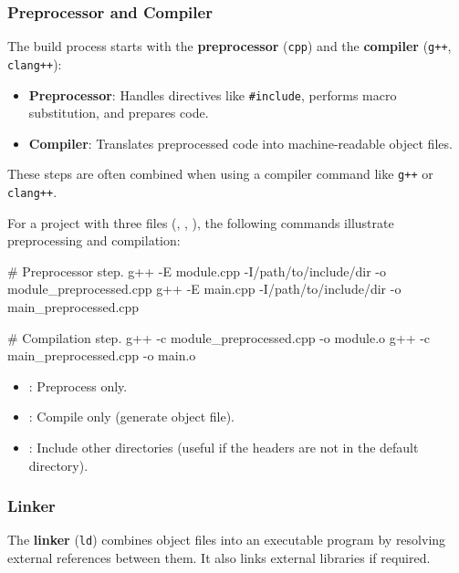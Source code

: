 \subsubsection{Preprocessor and Compiler}

The build process starts with the \textbf{preprocessor} (\texttt{cpp}) and the \textbf{compiler} (\texttt{g++}, \texttt{clang++}):
\begin{itemize}
    \item \textbf{Preprocessor}: Handles directives like \texttt{\#include}, performs macro substitution, and prepares code.
    \item \textbf{Compiler}: Translates preprocessed code into machine-readable object files.
    \end{itemize}

These steps are often combined when using a compiler command like \texttt{g++} or \texttt{clang++}.


    For a project with three files (, , ), the following commands illustrate preprocessing and compilation:
    
    \begin{codeblock}[language=bash, numbers=none]
# Preprocessor step.
g++ -E module.cpp -I/path/to/include/dir -o module_preprocessed.cpp
g++ -E main.cpp -I/path/to/include/dir -o main_preprocessed.cpp

# Compilation step.
g++ -c module_preprocessed.cpp -o module.o
g++ -c main_preprocessed.cpp -o main.o
    \end{codeblock}

    \begin{observationblock}
        \begin{itemize}
            \item {}: Preprocess only.
            \item {}: Compile only (generate object file).
            \item {}: Include other directories (useful if the headers are not in the default directory).
        \end{itemize}
    \end{observationblock}


\subsubsection{Linker}

The \textbf{linker} (\texttt{ld}) combines object files into an executable program by resolving external references between them. It also links external libraries if required.


